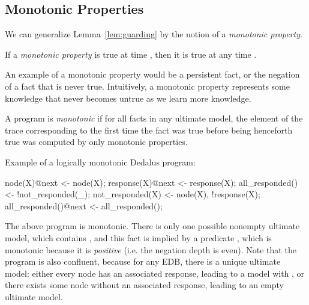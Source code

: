 \subsection{Monotonic Properties}

We can generalize Lemma~\ref{lem:guarding} by the notion of a {\em monotonic property}.

\begin{definition}
If a {\em monotonic property} is true at time , then it is true at any time .
\end{definition}

An example of a monotonic property would be a persistent fact, or the negation of a fact that is never true.  Intuitively, a monotonic property represents some knowledge that never becomes untrue as we learn more knowledge.

\begin{definition}
A \lang program is {\em monotonic} if for all facts in any ultimate model, the element of the trace corresponding to the first time the fact was true before being henceforth true was computed by only monotonic properties. 
\end{definition}

\begin{example}
Example of a logically monotonic Dedalus program:\\
\begin{Dedalus}
node(X)@next <- node(X);
response(X)@next <- response(X);
all_responded() <- !not_responded(_);
not_responded(X) <- node(X), !response(X);
all_responded()@next <- all_responded();
\end{Dedalus}
\end{example}

The above program is monotonic. There is only one possible nonempty ultimate model, which contains , and this fact is implied by a predicate , which is monotonic because it is {\em positive} (i.e. the negation depth is even).   Note that the program is also confluent, because for any EDB, there is a unique ultimate model: either every node has an associated response, leading to a model with , or there exists some node without an associated response, leading to an empty ultimate model.

